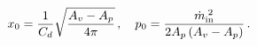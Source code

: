 \begin{equation*}
    x_0 = \frac{1}{C_d} \sqrt{\frac{A_v - A_p}{4 \pi}}
    \, , \quad
    p_0 = \frac{\dot{m}_{\rm{in}}^{\;2}}{2 A_p \left( A_v - A_p \right)} \, .
\end{equation*}





